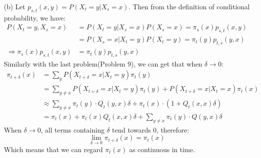 \begin{homeworkProblem}
(b) Let $p_{s,t}(x,y)=P(X_t=y|X_s=x)$. Then from the definition of conditional probability, we have:
\begin{align*}
P(X_t=y, X_s=x) &= P(X_t=y|X_s=x)P(X_s=x) = \pi_s(x)p_{s,t}(x,y) \\
&= P(X_s=x|X_t=y)P(X_t=y) = \pi_t(y)p_{t,s}(y,x) \\
\Rightarrow \pi_s(x)p_{s,t}(x,y) &= \pi_t(y)p_{t,s}(y,x)
\end{align*}
Similarly with the last problem(Problem 9), we can get that when $\delta\to 0$:
\begin{align*}
\pi_{t+\delta}(x) &= \sum_{y}P(X_{t+\delta}=x|X_t=y)\pi_t(y) \\
&= \sum_{y\neq x}P(X_{t+\delta}=x|X_t=y)\pi_t(y) + P(X_{t+\delta}=x|X_t=x)\pi_t(x) \\
&\approx  \sum_{y \neq x} \pi_t(y) \cdot Q_t(y, x) \delta + \pi_t(x) \cdot (1 + Q_t(x,x) \delta) \\
&= \pi_t(x) + \pi_t(x) Q_t(x,x) \delta + \sum_{y \neq x} \pi_t(y) \cdot Q(y, x) \delta
\end{align*}
When $\delta\to 0$, all terms containing $\delta$ tend towards 0, therefore:
\begin{equation}
\lim_{\delta \to 0} \pi_{t+\delta}(x) = \pi_t(x)
\label{eq:continuous}
\end{equation}
Which means that we can regard $\pi_t(x)$ as continuous in time.


\end{homeworkProblem}
